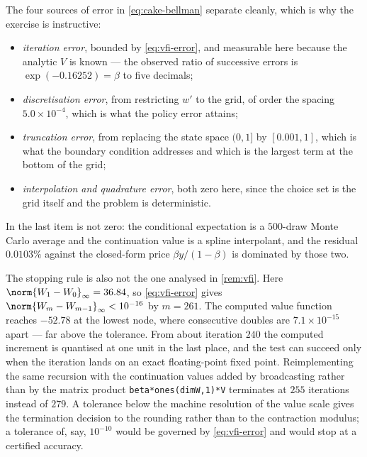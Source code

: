\begin{remark}
	The four sources of error in \eqref{eq:cake-bellman} separate cleanly, which
	is why the exercise is instructive:
	\begin{itemize}
		\item \emph{iteration error}, bounded by \eqref{eq:vfi-error}, and
		      measurable here because the analytic $V$ is known --- the observed
		      ratio of successive errors is $\exp(-0.16252)=\beta$ to five
		      decimals;
		\item \emph{discretisation error}, from restricting $w'$ to the grid, of
		      order the spacing $5.0\times10^{-4}$, which is what the policy error
		      attains;
		\item \emph{truncation error}, from replacing the state space $(0,1]$ by
		      $[0.001,1]$, which is what the boundary condition addresses and
		      which is the largest term at the bottom of the grid;
		\item \emph{interpolation and quadrature error}, both zero here, since the
		      choice set is the grid itself and the problem is deterministic.
	\end{itemize}
	In  the last item is not zero: the conditional
	expectation is a $500$-draw Monte Carlo average and the continuation value is
	a spline interpolant, and the residual $0.0103\%$ against the closed-form
	price $\beta y/(1-\beta)$ is dominated by those two.

	The stopping rule is also not the one analysed in \autoref{rem:vfi}. Here
	$\norm{W_1-W_0}_\infty=36.84$, so \eqref{eq:vfi-error} gives
	$\norm{W_m-W_{m-1}}_\infty<10^{-16}$ by $m=261$. The computed value function
	reaches $-52.78$ at the lowest node, where consecutive doubles are
	$7.1\times10^{-15}$ apart --- far above the tolerance. From about iteration
	$240$ the computed increment is quantised at one unit in the last place, and
	the test can succeed only when the iteration lands on an exact floating-point
	fixed point. Reimplementing the same recursion with the continuation values
	added by broadcasting rather than by the matrix product
	\verb|beta*ones(dimW,1)*V| terminates at $255$ iterations instead of $279$. A
	tolerance below the machine resolution of the value scale gives the
	termination decision to the rounding rather than to the contraction modulus;
	a tolerance of, say, $10^{-10}$ would be governed by \eqref{eq:vfi-error} and
	would stop at a certified accuracy.
\end{remark}

